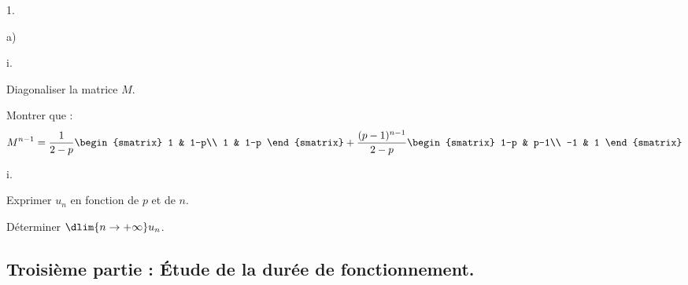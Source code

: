 \documentclass[11pt]{article}%
\begin{document}
\begin{noliste}{1.}
\begin{noliste}{a)}
    
    
  \item 
    \begin{nonoliste}{i.}
    \item Diagonaliser la matrice $M$.
      
      
      
    \item Montrer que :
      \[
      M^{n-1}=\dfrac{1}{2-p}
      \begin{smatrix} 
        1 & 1-p\\
        1 & 1-p
      \end{smatrix}
      + \dfrac{(p-1)^{n-1}}{2-p}
      \begin{smatrix} 
        1-p & p-1\\
        -1 & 1 
      \end{smatrix}
      \]

      

    \end{nonoliste}
    
  \item 
    \begin{nonoliste}{i.}
    \item Exprimer $u_n$ en fonction de $p$ et de $n$. 

      

    \item Déterminer $\dlim{n \to +\infty} u_n$. 

      

    \end{nonoliste}
  \end{noliste}
\end{noliste}

\subsection*{Troisième partie : Étude de la durée de fonctionnement.}
\end{document}
